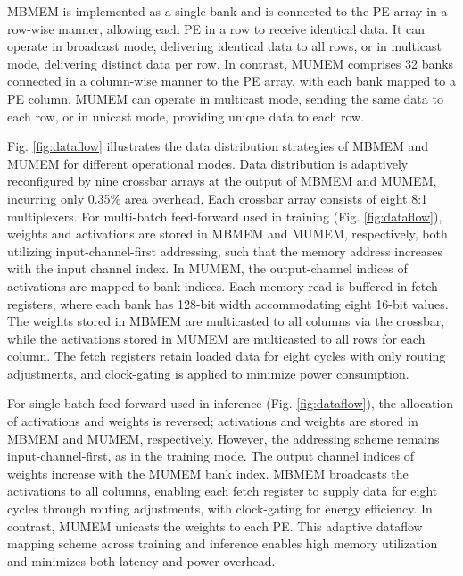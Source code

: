 MBMEM is implemented as a single bank and is connected to the PE array in a row-wise manner, allowing each PE in a row to receive identical data. It can operate in broadcast mode, delivering identical data to all rows, or in multicast mode, delivering distinct data per row. In contrast, MUMEM comprises 32 banks connected in a column-wise manner to the PE array, with each bank mapped to a PE column. MUMEM can operate in multicast mode, sending the same data to each row, or in unicast mode, providing unique data to each row.

Fig. \ref{fig:dataflow} illustrates the data distribution strategies of MBMEM and MUMEM for different operational modes. Data distribution is adaptively reconfigured by nine crossbar arrays at the output of MBMEM and MUMEM, incurring only 0.35\% area overhead. Each crossbar array consists of eight 8:1 multiplexers. For multi-batch feed-forward used in training (Fig. \ref{fig:dataflow}), weights and activations are stored in MBMEM and MUMEM, respectively, both utilizing input-channel-first addressing, such that the memory address increases with the input channel index. In MUMEM, the output-channel indices of activations are mapped to bank indices. Each memory read is buffered in fetch registers, where each bank has 128-bit width accommodating eight 16-bit values. The weights stored in MBMEM are multicasted to all columns via the crossbar, while the activations stored in MUMEM are multicasted to all rows for each column. The fetch registers retain loaded data for eight cycles with only routing adjustments, and clock-gating is applied to minimize power consumption.

For single-batch feed-forward used in inference (Fig. \ref{fig:dataflow}), the allocation of activations and weights is reversed; activations and weights are stored in MBMEM and MUMEM, respectively. However, the addressing scheme remains input-channel-first, as in the training mode. The output channel indices of weights increase with the MUMEM bank index. MBMEM broadcasts the activations to all columns, enabling each fetch register to supply data for eight cycles through routing adjustments, with clock-gating for energy efficiency. In contrast, MUMEM unicasts the weights to each PE. This adaptive dataflow mapping scheme across training and inference enables high memory utilization and minimizes both latency and power overhead.



